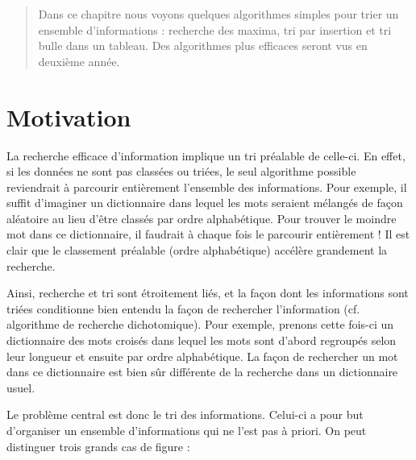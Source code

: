 \documentclass[11pt,a4paper]{article}
\begin{document}
            \begin{abstract}
			Dans ce chapitre nous voyons quelques algorithmes simples pour trier un ensemble d'informations : 
			recherche des maxima, tri par insertion et tri bulle dans un tableau. Des algorithmes
			plus efficaces seront vus en deuxi\`eme ann\'ee.
    
            \par
        \end{abstract}
				\vspace{-2em}\tableofcontents
				\pagestyle{plain}
            \clearpage
            \fancyhead[L,C,R]{}
            \fancyfoot[L,C]{}
            \fancyfoot[R]{ \scriptsize{\textcolor{gray}{
				TDTri - page \thepage}}}
				\thispagestyle{fancy}
				\pagestyle{fancy}
	   
            \section{Motivation}
        La recherche efficace d'information implique un tri pr\'ealable de celle-ci. En effet, si les
        donn\'ees ne sont pas class\'ees ou tri\'ees, le seul algorithme possible reviendrait \`a parcourir
        enti\`erement l'ensemble des informations. Pour exemple, il suffit d'imaginer un dictionnaire
        dans lequel les mots seraient m\'elang\'es de fa\c con al\'eatoire au lieu d'\^etre class\'es par ordre
        alphab\'etique. Pour trouver le moindre mot dans ce dictionnaire, il faudrait \`a chaque fois le
        parcourir enti\`erement ! Il est clair que le classement pr\'ealable (ordre alphab\'etique) acc\'el\`ere
        grandement la recherche.
		
            \par
        
		  Ainsi, recherche et tri sont \'etroitement li\'es, et la fa\c con dont les informations sont tri\'ees
      conditionne bien entendu la fa\c con de rechercher l'information (cf. algorithme de recherche
      dichotomique). Pour exemple, prenons cette fois-ci un dictionnaire des mots crois\'es dans
      lequel les mots sont d'abord regroup\'es selon leur longueur et ensuite par ordre alphab\'etique.
      La fa\c con de rechercher un mot dans ce dictionnaire est bien s\^ur diff\'erente de la recherche
      dans un dictionnaire usuel.
		
            \par
        
		  Le probl\`eme central est donc le tri des informations. Celui-ci a pour but d'organiser un
      ensemble d'informations qui ne l'est pas \`a priori. On peut distinguer trois grands cas de
      figure :
		
\end{document}
